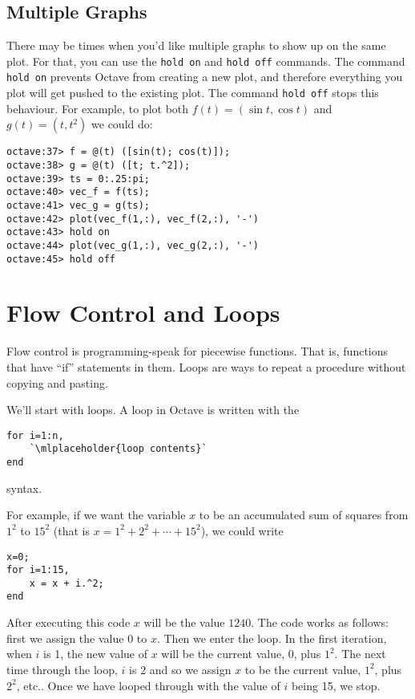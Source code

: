 \documentclass[letter]{article}
\begin{document}
	\subsection{Multiple Graphs}
	There may be times when you'd like multiple graphs to show up on
	the same plot.  For that, you can use the {\tt hold on} and 
	{\tt hold off} commands.  The command {\tt hold on} prevents {\sc Octave}
	from creating a new plot, and therefore everything you plot will get pushed
	to the existing plot.  The command {\tt hold off} stops this behaviour.
	For example, to plot both $f(t) = (\sin t,\cos t)$ and $g(t)=(t,t^2)$ we
	could do:
	\begin{lstlisting}[style=Matlab-Pyglike,escapechar=`]
octave:37> f = @(t) ([sin(t); cos(t)]);
octave:38> g = @(t) ([t; t.^2]);
octave:39> ts = 0:.25:pi;
octave:40> vec_f = f(ts);
octave:41> vec_g = g(ts);
octave:42> plot(vec_f(1,:), vec_f(2,:), '-')
octave:43> hold on
octave:44> plot(vec_g(1,:), vec_g(2,:), '-')
octave:45> hold off
	\end{lstlisting}

	\section{Flow Control and Loops}
	Flow control is programming-speak for piecewise functions.  That is, functions that 
	have ``if'' statements in them.  Loops are ways to repeat a procedure without
	copying and pasting.


	We'll start with loops.  A loop in {\sc Octave} is written with the 
	\begin{lstlisting}[style=Matlab-Pyglike,escapechar=`]
for i=1:n,
    `\mlplaceholder{loop contents}`
end
	\end{lstlisting}
	syntax.

	For example, if we want the variable $x$ to be an accumulated sum of squares from $1^2$ to $15^2$ 
	(that is $x=1^2+2^2+\cdots+15^2$), we could write
	\begin{lstlisting}[style=Matlab-Pyglike,escapechar=`]
x=0;
for i=1:15,
    x = x + i.^2;
end
	\end{lstlisting}
	After executing this code $x$ will be the value $1240$.  The code works as follows: first we assign the value
	$0$ to $x$.  Then we enter the loop.  In the first iteration, when $i$ is 1, the new value of $x$ will be the current value,
	0, plus $1^2$.  The next time through the loop, $i$ is 2 and so we assign $x$ to be the current value, $1^2$, plus
	$2^2$, etc.. Once we have looped through with the value of $i$ being 15, we stop.
\end{document}

